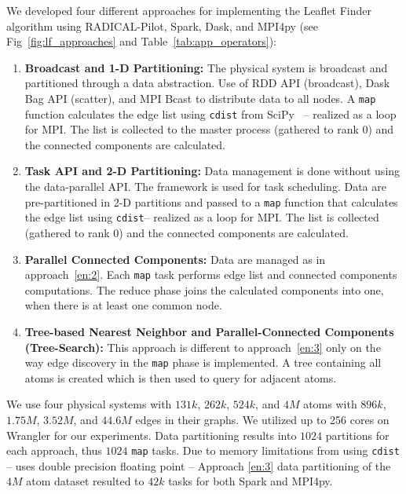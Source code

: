 We developed four different approaches for implementing the Leaflet Finder algorithm using RADICAL-Pilot, Spark, Dask, and MPI4py (see Fig~\ref{fig:lf_approaches} and Table~\ref{tab:app_operators}):
\begin{enumerate}[1)]
    \item \textbf{Broadcast and 1-D Partitioning:}
    The physical system is broadcast and partitioned through a data abstraction.
    Use of RDD API (broadcast), Dask Bag API (scatter), and MPI Bcast to distribute data to all nodes.
    A \texttt{map} function calculates the edge list using \texttt{cdist} from SciPy~\cite{scipy} -- realized as a loop for MPI.
    The list is collected to the master process (gathered to rank 0) and the connected components are calculated.\label{en:1}
    \item \textbf{Task API and 2-D Partitioning:}
    Data management is done without using the data-parallel API.
    The framework is used for task scheduling.
    Data are pre-partitioned in 2-D partitions and passed to a \texttt{map} function that calculates the edge list using \texttt{cdist}-- realized as a loop for MPI.
    The list is collected (gathered to rank 0) and the connected components are calculated.\label{en:2}
    \item \textbf{Parallel Connected Components:}
    Data are managed as in approach~\ref{en:2}.
    Each \texttt{map} task performs edge list and connected components computations.
    The reduce phase joins the calculated components into one, when there is at least one common node.\label{en:3}
    \item \textbf{Tree-based Nearest Neighbor and Parallel-Connected Components (Tree-Search):}
    This approach is different to approach~\ref{en:3} only on the way edge discovery in the \texttt{map} phase is implemented.
    A tree containing all atoms is created which is then used to query for adjacent atoms.\label{en:4}
\end{enumerate}

We use four physical systems with $131k$, $262k$, $524k$, and $4M$ atoms with $896k$, $1.75M$, $3.52M$, and $44.6M$ edges in their graphs.
We utilized up to 256 cores on Wrangler for our experiments.
Data partitioning results into $1024$ partitions for each approach, thus $1024$ \texttt{map} tasks.
Due to memory limitations from using \texttt{cdist} -- uses double precision floating point -- Approach \ref{en:3} data partitioning of the $4M$ atom dataset resulted to $42k$ tasks for both Spark and MPI4py.

